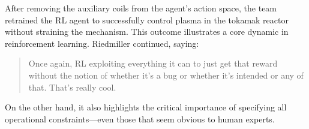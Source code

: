 After removing the auxiliary coils from the agent's action space, the team retrained the RL agent to successfully control plasma in the tokamak reactor without straining the mechanism.
This outcome illustrates a core dynamic in reinforcement learning. Riedmiller continued, saying:

\begin{quote}
    Once again, RL exploiting everything it can to just get that reward without the notion of whether it's a bug or whether it's intended or any of that. That's really cool.
\end{quote}

On the other hand, it also highlights the critical importance of specifying all operational constraints---even those that seem obvious to human experts.
